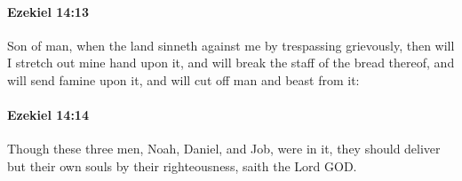		\paragraph{Ezekiel 14:13} %
			\label{EZEKIEL-14-13}

			Son of man, when the land sinneth against me by trespassing grievously, then will I stretch out mine hand upon it, and will break the staff of the bread thereof, and will send famine upon it, and will cut off man and beast from it:


		\paragraph{Ezekiel 14:14} %
			\label{EZEKIEL-14-14}

			Though these three men, Noah, Daniel, and Job, were in it, they should deliver but their own souls by their righteousness, saith the Lord GOD.

